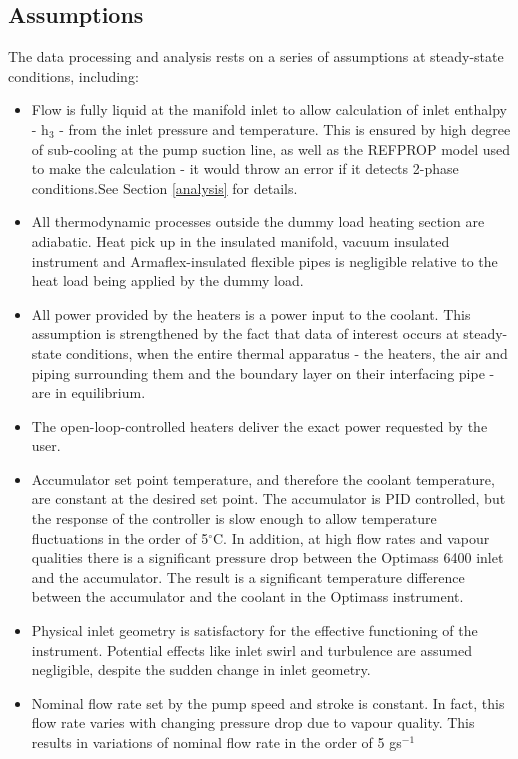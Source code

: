 \documentclass{report}
\begin{document}
\subsection{Assumptions}
The data processing and analysis rests on a series of assumptions at steady-state conditions, including:
\begin{itemize}
\item{Flow is fully liquid at the manifold inlet to allow calculation of inlet enthalpy - h$_3$ - from the inlet pressure and temperature. This is ensured by high degree of sub-cooling at the pump suction line, as well as the REFPROP model used to make the calculation - it would throw an error if it detects 2-phase conditions.See Section \ref{analysis} for details.}
\item{All thermodynamic processes outside the dummy load heating section are adiabatic. Heat pick up in the insulated manifold, vacuum insulated instrument and Armaflex-insulated flexible pipes is negligible relative to the heat load being applied by the dummy load.}
\item{All power provided by the heaters is a power input to the coolant. This assumption is strengthened by the fact that data of interest occurs at steady-state conditions, when the entire thermal apparatus - the heaters, the air and piping surrounding them and the boundary layer on their interfacing pipe - are in equilibrium.}
\item{The open-loop-controlled heaters deliver the exact power requested by the user.}
\item{Accumulator set point temperature, and therefore the coolant temperature, are constant at the desired set point. The accumulator is PID controlled, but the response of the controller is slow enough to allow temperature fluctuations in the order of 5$^\circ$C. In addition, at high flow rates and vapour qualities there is a significant pressure drop between the Optimass 6400 inlet and the accumulator. The result is a significant temperature difference between the accumulator and the coolant in the Optimass instrument.}
\item{Physical inlet geometry is satisfactory for the effective functioning of the instrument. Potential effects like inlet swirl and turbulence are assumed negligible, despite the sudden change in inlet geometry.}
\item{Nominal flow rate set by the pump speed and stroke is constant. In fact, this flow rate varies with changing pressure drop due to vapour quality. This results in variations of nominal flow rate in the order of 5 gs$^{-1}$}
\end{itemize}
\end{document}
